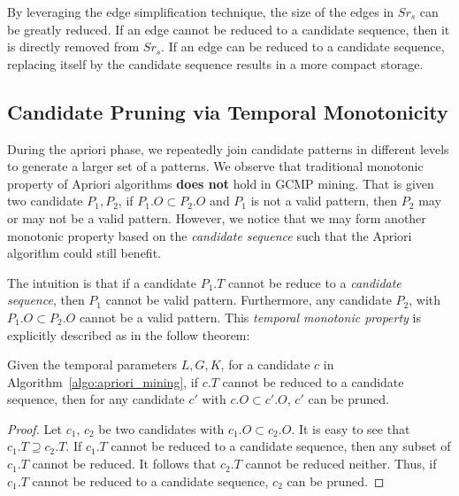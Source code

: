 By leveraging the edge simplification technique, 
the size of the edges in $Sr_s$ can be greatly reduced. If
an edge cannot be reduced to a candidate sequence, then it is directly removed from $Sr_s$.
If an edge can be reduced to a candidate sequence, replacing itself 
by the candidate sequence results in a more compact storage.

%


\subsection{Candidate Pruning via Temporal Monotonicity}
During the apriori phase, we repeatedly join candidate patterns in different levels to generate a larger set
of a patterns. We observe that traditional monotonic property of Apriori algorithms \textbf{does not}
hold in GCMP mining. That is given two candidate $P_1, P_2$, if $P_1.O \subset P_2.O$ and $P_1$ is not 
a valid pattern, then $P_2$ may or may not be a valid pattern. However, we notice that
we may form another monotonic property based on the \emph{candidate sequence} such that
the Apriori algorithm could still benefit.

The intuition is that if a candidate $P_1.T$ cannot be reduce to a \emph{candidate sequence}, then $P_1$ cannot 
be valid pattern. Furthermore, any candidate $P_2$, with $P_1.O \subset P_2.O$ cannot be a valid pattern.
This \emph{temporal monotonic property} 
is explicitly described as in the follow theorem:

\begin{theorem}
Given the temporal parameters $L,G,K$, for a candidate $c$ in Algorithm~\ref{algo:apriori_mining},
if $c.T$ cannot be reduced to a candidate sequence, then for any candidate $c'$ with $c.O \subset c'.O$, $c'$ can be pruned.
\end{theorem}
\begin{proof}
Let $c_1$, $c_2$ be two candidates with $c_1.O \subset c_2.O$. It is easy to see that $c_1.T \supseteq c_2.T$.
If $c_1.T$ cannot be reduced to a candidate sequence, then any subset of $c_1.T$ cannot
be reduced. It follows that $c_2.T$ cannot be reduced neither. Thus,
if $c_1.T$ cannot be reduced to a candidate sequence, $c_2$ can be pruned. 
\end{proof}

